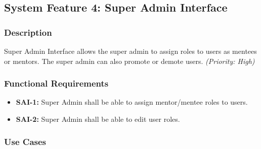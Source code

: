 \subsection{System Feature 4: Super Admin Interface} 


\subsubsection{Description}

Super Admin Interface allows the super admin to assign roles to users as mentees
or mentors. The super admin can also promote or demote users.
\textit{(Priority: High)}



\subsubsection{Functional Requirements}
\begin{itemize}[label=$\bullet$]
    \item \textbf{SAI-1:} Super Admin shall be able to assign mentor/mentee
    roles to users.
    
    \item \textbf{SAI-2:} Super Admin shall be able to edit user roles.
\end{itemize}



\subsubsection{Use Cases}

